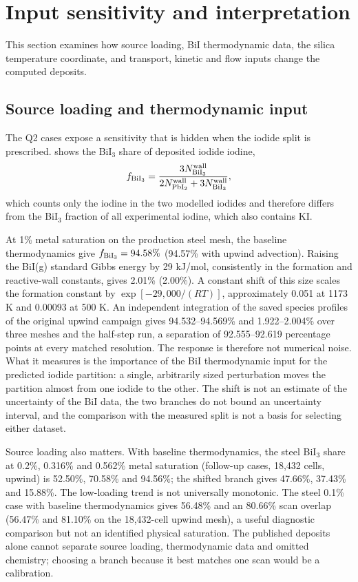 \section{Input sensitivity and interpretation}
\label{sec:sensitivity}
This section examines how source loading, BiI thermodynamic data, the
silica temperature coordinate, and transport, kinetic and flow inputs
change the computed deposits.

\subsection{Source loading and thermodynamic input}
The Q2 cases expose a sensitivity that is hidden when the iodide split
is prescribed.  shows the BiI$_3$ share of deposited
iodide iodine,
\begin{equation}
 f_{\rm BiI_3}=
 \frac{3N^{\rm wall}_{\rm BiI_3}}
 {2N^{\rm wall}_{\rm PbI_2}+3N^{\rm wall}_{\rm BiI_3}},
 \label{eq:split}
\end{equation}
which counts only the iodine in the two modelled iodides and therefore
differs from the BiI$_3$ fraction of all experimental iodine, which also
contains KI.

At 1\% metal saturation on the production steel mesh, the baseline
thermodynamics give $f_{\rm BiI_3}=94.58\%$ (94.57\% with upwind
advection). Raising the BiI(g) standard Gibbs energy by 29 kJ/mol,
consistently in the formation and reactive-wall constants, gives 2.01\%
(2.00\%). A constant shift of this size scales the formation constant by
$\exp[-29{,}000/(RT)]$, approximately 0.051 at 1173 K and 0.00093 at
500 K. An independent integration of the saved species profiles of the
original upwind campaign gives 94.532--94.569\% and 1.922--2.004\% over
three meshes and the half-step run, a separation of 92.555--92.619
percentage points at every matched resolution. The response is
therefore not numerical noise. What it measures is the importance of
the BiI thermodynamic input for the predicted iodide partition: a
single, arbitrarily sized perturbation moves the partition almost from
one iodide to the other. The shift is not an estimate of the
uncertainty of the BiI data, the two branches do not bound an
uncertainty interval, and the comparison with the measured split is not
a basis for selecting either dataset.

Source loading also matters. With baseline thermodynamics, the steel
BiI$_3$ share at 0.2\%, 0.316\% and 0.562\% metal saturation
(follow-up cases, 18,432 cells, upwind) is 52.50\%, 70.58\% and
94.56\%; the shifted branch gives 47.66\%, 37.43\% and 15.88\%. The
low-loading trend is not universally monotonic. The steel 0.1\% case
with baseline thermodynamics gives 56.48\% and an 80.66\% scan overlap
(56.47\% and 81.10\% on the 18,432-cell upwind mesh), a useful
diagnostic comparison but not an identified physical saturation. The
published deposits alone cannot separate source loading, thermodynamic
data and omitted chemistry; choosing a branch because it best matches
one scan would be a calibration.


